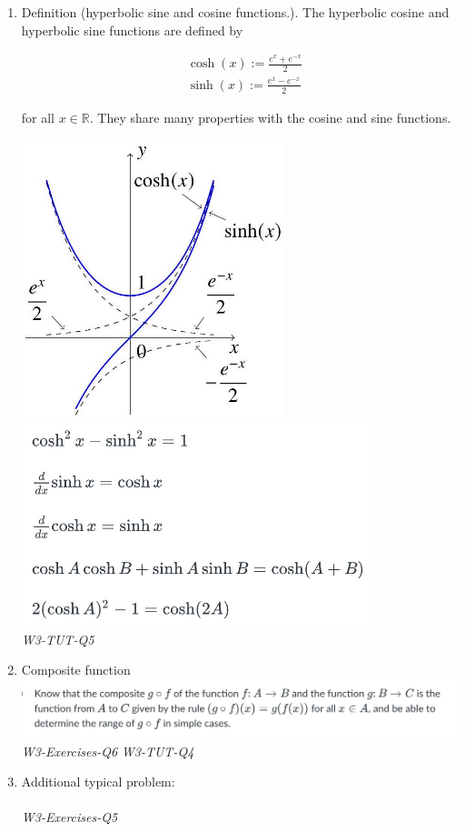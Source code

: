 \documentclass[10pt]{article}
\begin{document}
\begin{enumerate}
\newpage


\item Definition (hyperbolic sine and cosine functions.). The hyperbolic cosine and hyperbolic sine functions are defined by

$$
\begin{aligned}
& \cosh (x):=\frac{e^{x}+e^{-x}}{2} \\
& \sinh (x):=\frac{e^{x}-e^{-x}}{2}
\end{aligned}
$$

for all $x \in \mathbb{R}$. They share many properties with the cosine and sine functions.


\includegraphics[width=0.6\textwidth]{images/W3-1.jpg}\\
\includegraphics[width=0.8\textwidth]{images/W3-3.jpg}\\
\textit{W3-TUT-Q5}

\newpage

\item Composite function\\
\includegraphics[width=1\textwidth]{images/W3-2.jpg}\\
\textit{W3-Exercises-Q6}
\textit{W3-TUT-Q4}



\item Additional typical problem:\\\\
\textit{W3-Exercises-Q5}

\end{enumerate}
\end{document}
